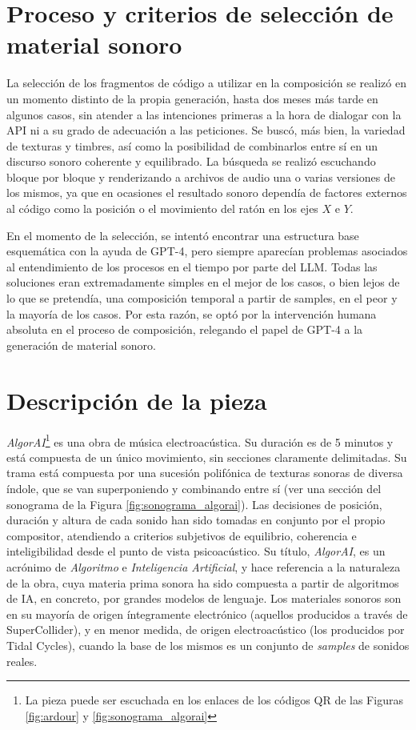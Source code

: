 \section{Proceso y criterios de selección de material sonoro}

La selección de los fragmentos de código a utilizar en la composición se realizó en un momento distinto de la propia generación, hasta dos meses más tarde en algunos casos, sin atender a las intenciones primeras a la hora de dialogar con la API ni a su grado de adecuación a las peticiones. Se buscó, más bien, la variedad de texturas y timbres, así como la posibilidad de combinarlos entre sí en un discurso sonoro coherente y equilibrado. La búsqueda se realizó escuchando bloque por bloque y renderizando a archivos de audio una o varias versiones de los mismos, ya que en ocasiones el resultado sonoro dependía de factores externos al código como la posición o el movimiento del ratón en los ejes $X$ e $Y$. 

En el momento de la selección, se intentó encontrar una estructura base esquemática con la ayuda de GPT-4, pero siempre aparecían problemas asociados al entendimiento de los procesos en el tiempo por parte del LLM. Todas las soluciones eran extremadamente simples en el mejor de los casos, o bien lejos de lo que se pretendía, una composición temporal a partir de samples, en el peor y la mayoría de los casos. Por esta razón, se optó por la intervención humana absoluta en el proceso de composición, relegando el papel de GPT-4 a la generación de material sonoro.

\section{Descripción de la pieza}

\textit{AlgorAI}\footnote{La pieza puede ser escuchada en los enlaces de los códigos QR de las Figuras \ref{fig:ardour} y \ref{fig:sonograma_algorai}} es una obra de música electroacústica. Su duración es de 5 minutos y está compuesta de un único movimiento, sin secciones claramente delimitadas. Su trama está compuesta por una sucesión polifónica de texturas sonoras de diversa índole, que se van superponiendo y combinando entre sí (ver una sección del sonograma de la Figura \ref{fig:sonograma_algorai}). Las decisiones de posición, duración y altura de cada sonido han sido tomadas en conjunto por el propio compositor, atendiendo a criterios subjetivos de equilibrio, coherencia e inteligibilidad desde el punto de vista psicoacústico. Su título, \textit{AlgorAI}, es un acrónimo de \textit{Algoritmo} e \textit{Inteligencia Artificial}, y hace referencia a la naturaleza de la obra, cuya materia prima sonora ha sido compuesta a partir de algoritmos de IA, en concreto, por grandes modelos de lenguaje. Los materiales sonoros son en su mayoría de origen íntegramente electrónico (aquellos producidos a través de SuperCollider), y en menor medida, de origen electroacústico (los producidos por Tidal Cycles), cuando la base de los mismos es un conjunto de \textit{samples} de sonidos reales.

